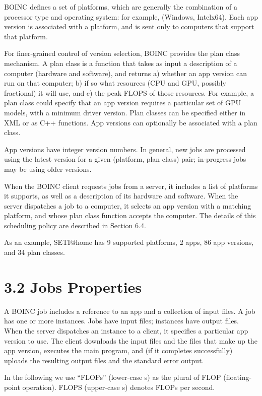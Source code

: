 \documentclass[
]{article}
\begin{document}
BOINC defines a set of platforms, which are generally the combination of
a processor type and operating system: for example, (Windows, Intelx64).
Each app version is associated with a platform, and is sent only to
computers that support that platform.

For finer-grained control of version selection, BOINC provides the plan
class mechanism. A plan class is a function that takes as input a
description of a computer (hardware and software), and returns a)
whether an app version can run on that computer; b) if so what resources
(CPU and GPU, possibly fractional) it will use, and c) the peak FLOPS of
those resources. For example, a plan class could specify that an app
version requires a particular set of GPU models, with a minimum driver
version. Plan classes can be specified either in XML or as C++
functions. App versions can optionally be associated with a plan class.

App versions have integer version numbers. In general, new jobs are
processed using the latest version for a given (platform, plan class)
pair; in-progress jobs may be using older versions.

When the BOINC client requests jobs from a server, it includes a list of
platforms it supports, as well as a description of its hardware and
software. When the server dispatches a job to a computer, it selects an
app version with a matching platform, and whose plan class function
accepts the computer. The details of this scheduling policy are
described in Section 6.4.

As an example, SETI@home has 9 supported platforms, 2 apps, 86 app
versions, and 34 plan classes.

\section{3.2 Jobs Properties}\label{jobs-properties}

A BOINC job includes a reference to an app and a collection of input
files. A job has one or more instances. Jobs have input files; instances
have output files. When the server dispatches an instance to a client,
it specifies a particular app version to use. The client downloads the
input files and the files that make up the app version, executes the
main program, and (if it completes successfully) uploads the resulting
output files and the standard error output.

In the following we use ``FLOPs'' (lower-case s) as the plural of FLOP
(floating-point operation). FLOPS (upper-case s) denotes FLOPs per
second.
\end{document}
